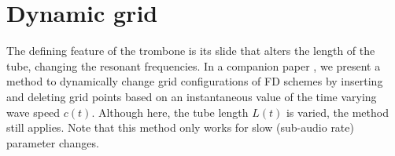 \section{Dynamic grid}\label{sec:dynamicGrid}
The defining feature of the trombone is its slide that alters the length of the tube, changing the resonant frequencies. In a companion paper \cite{Willemsen2021}, we present a method to dynamically change grid configurations of FD schemes by inserting and deleting grid points based on an instantaneous value of the time varying wave speed $c(t)$. Although here, the tube length $L(t)$ is varied, the method still applies. %
Note that this method only works for slow (sub-audio rate) parameter changes.

